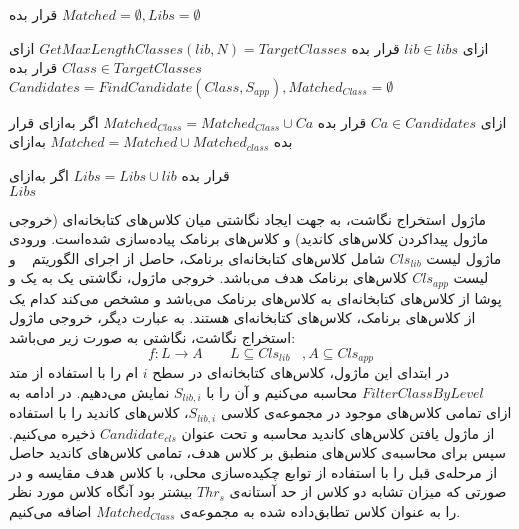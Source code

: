  قرار بده $Matched=\emptyset ,Libs = \emptyset$ 

‌ازای $lib \in libs$ 
 قرار بده $GetMaxLengthClasses‬‬(lib,N)‫‪ = TargetClasses$
‌ازای $Class \in TargetClasses$
 قرار بده  $Candidates = FindCandidate(Class,S_{app}), Matched_{Class} = \emptyset$   

‌ازای $Ca \in Candidates$
 قرار بده $Matched_{Class} = Matched_{Class} \cup {Ca}$
‌اگر
‌به‌ازای
 قرار بده $Matched = Matched \cup Matched_{class}$
‌به‌ازای

 قرار‌ بده $Libs = Libs \cup lib$
‌اگر
‌به‌ازای\\
 $Libs$

ماژول استخراج نگاشت، به جهت ایجاد نگاشتی میان کلاس‌های کتابخانه‌ای (خروجی ماژول پیداکردن کلاس‌های کاندید)‌ و کلاس‌های برنامک پیاده‌سازی شده‌است. ورودی ماژول لیست $Cls_{lib}$  شامل کلاس‌های کتابخانه‌ای برنامک، حاصل از اجرای الگوریتم ~ و لیست $Cls_{app}$ کلاس‌های برنامک هدف می‌باشد. خروجی ماژول، نگاشتی یک به یک و پوشا از کلاس‌های کتابخانه‌ای به کلاس‌های برنامک می‌باشد و مشخص می‌کند کدام یک از کلاس‌های برنامک، کلاس‌های کتابخانه‌ای هستند. به عبارت دیگر، خروجی ماژول استخراج نگاشت، نگاشتی به صورت زیر می‌باشد:
  \begin{equation}
  	f: L \rightarrow A  \;\;\;\;\;\;\; L\subseteq Cls_{lib}  \;\;\; , A \subseteq Cls_{app}
  \end{equation}
در ابتدای این ماژول، کلاس‌های کتابخانه‌ای در سطح $i$ ام را با استفاده از متد $FilterClassByLevel$ محاسبه می‌کنیم و آن‌ را با $S_{lib,i}$ نمایش می‌دهیم. در ادامه به ازای تمامی کلاس‌های موجود در مجموعه‌ی کلاسی $S_{lib,i}$، کلاس‌های کاندید را با استفاده از ماژول یافتن کلاس‌های کاندید محاسبه و تحت عنوان $Candidate_{cls}$ ذخیره می‌کنیم.  سپس برای محاسبه‌ی کلاس‌های منطبق بر کلاس هدف، تمامی کلاس‌های کاندید حاصل از مرحله‌ی قبل را با استفاده از توابع چکیده‌سازی محلی، با کلاس هدف مقایسه و در صورتی که میزان تشابه دو کلاس از حد آستانه‌ی $Thr_{s}$ بیشتر بود آنگاه کلاس مورد نظر را به عنوان کلاس تطابق‌داده شده به مجموعه‌ی $Matched_{Class}$ اضافه می‌کنیم.  

